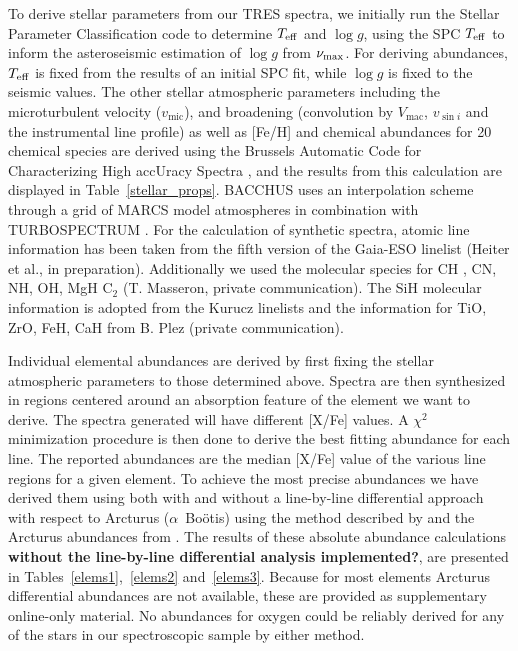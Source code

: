 \documentclass[a4paper,fleqn,usenatbib]{mnras}
\newcommand{\numax}{\mbox{$\nu_{\rm max}$}\xspace}
\newcommand{\teff}{\mbox{$T_{\rm eff}$}\xspace}
\newcommand{\logg}{\mbox{$\log g$}\xspace}
\begin{document}
To derive stellar parameters from our TRES spectra, we initially run the Stellar Parameter Classification \citep[SPC:][]{spc} code to determine \teff and \logg, using the SPC \teff to inform the asteroseismic estimation of \logg from \numax. For deriving abundances, \teff is fixed from the results of an initial SPC fit, while \logg is fixed to the seismic values. The other stellar atmospheric parameters including the microturbulent velocity ($v_{\text{mic}}$), and broadening (convolution by $V_{\text{mac}}$, $v_{\sin{i}}$ and the instrumental line profile) as well as [Fe/H] and chemical abundances for 20 chemical species are derived using the Brussels Automatic Code for Characterizing High accUracy Spectra \citep[BACCHUS:][]{bacchus}, and the results from this calculation are displayed in Table~\ref{stellar_props}. BACCHUS uses an interpolation scheme through a grid of MARCS model atmospheres \citep{Gustafsson2008} in combination with TURBOSPECTRUM \citep{Alvarez1998, Plez2012}. For the calculation of synthetic spectra, atomic line information has been taken from the fifth version of the Gaia-ESO linelist (Heiter et al., in preparation). Additionally we used the molecular species for CH \citep{Masseron2014}, CN, NH, OH, MgH  C$_{2}$ (T. Masseron, private communication). The SiH molecular information is adopted from the Kurucz linelists and the information for TiO, ZrO, FeH, CaH from B. Plez (private communication). 

Individual elemental abundances are derived by first fixing the stellar atmospheric parameters to those determined above. Spectra are then synthesized  in regions centered around an absorption  feature of the element we want to derive. The spectra generated will have different [X/Fe] values. A $\chi^2$ minimization procedure is then done to derive the best fitting abundance for each line. The reported abundances are the median [X/Fe] value of the various line regions for a given element. To achieve the most precise abundances we have derived them using  both with and without a line-by-line differential approach with respect to Arcturus ($\alpha$~Bo\"{o}tis) using the method described by \citet{gaiabenchmark4} and the Arcturus abundances from \citep{hawkinsapogee}. The results of these absolute abundance calculations {\bf without the line-by-line differential analysis implemented?}, are presented in Tables~\ref{elems1},~\ref{elems2} and~\ref{elems3}. Because for most elements Arcturus differential abundances are not available, these are provided as supplementary online-only material. No abundances for oxygen could be reliably derived for any of the stars in our spectroscopic sample by either method.
\end{document}
